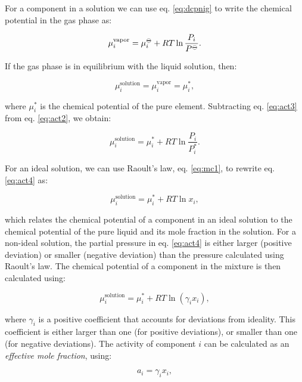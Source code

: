 \documentclass[
  9pt,
]{extbook}
\theoremstyle{definition}
\theoremstyle{definition}
\theoremstyle{definition}
\theoremstyle{remark}
\begin{document}
For a component in a solution we can use eq. \eqref{eq:dcpnig} to write the chemical potential in the gas phase as:

\begin{equation}
\mu_i^{\text{vapor}} = \mu_i^{{-\kern-6pt{\ominus}\kern-6pt-}} + RT \ln \frac{P_i}{P^{{-\kern-6pt{\ominus}\kern-6pt-}}}.
\label{eq:act2}
\end{equation}

If the gas phase is in equilibrium with the liquid solution, then:

\begin{equation}
\mu_i^{\text{solution}} = \mu_i^{\text{vapor}} = \mu_i^*,
\label{eq:act3}
\end{equation}

where \(\mu_i^*\) is the chemical potential of the pure element. Subtracting eq. \eqref{eq:act3} from eq. \eqref{eq:act2}, we obtain:

\begin{equation}
\mu_i^{\text{solution}} = \mu_i^* + RT \ln \frac{P_i}{P^*_i}.
\label{eq:act4}
\end{equation}

For an ideal solution, we can use Raoult's law, eq. \eqref{eq:mc1}, to rewrite eq. \eqref{eq:act4} as:

\begin{equation}
\mu_i^{\text{solution}} = \mu_i^* + RT \ln x_i,
\label{eq:act5}
\end{equation}

which relates the chemical potential of a component in an ideal solution to the chemical potential of the pure liquid and its mole fraction in the solution. For a non-ideal solution, the partial pressure in eq. \eqref{eq:act4} is either larger (positive deviation) or smaller (negative deviation) than the pressure calculated using Raoult's law. The chemical potential of a component in the mixture is then calculated using:

\begin{equation}
\mu_i^{\text{solution}} = \mu_i^* + RT \ln \left(\gamma_i x_i\right),
\label{eq:act6}
\end{equation}

where \(\gamma_i\) is a positive coefficient that accounts for deviations from ideality. This coefficient is either larger than one (for positive deviations), or smaller than one (for negative deviations). The activity of component \(i\) can be calculated as an \emph{effective mole fraction}, using:

\begin{equation}
a_i = \gamma_i x_i,
\label{eq:act7}
\end{equation}
\end{document}

